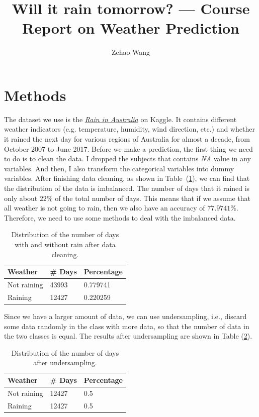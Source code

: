 \documentclass[11pt, a4paper, jou]{apa7}
\title{Will it rain tomorrow? --- Course Report on Weather Prediction}
\author{Zehao Wang}
\begin{document}
\maketitle
\section{Methods}
The dataset we use is the \href{https://www.kaggle.com/datasets/jsphyg/weather-dataset-rattle-package}{\emph{Rain in Australia}} on Kaggle. It contains different weather indicators (e.g. temperature, humidity, wind direction, etc.) and whether it rained the next day for various regions of Australia for almost a decade, from October 2007 to June 2017. Before we make a prediction, the first thing we need to do is to clean the data. I dropped the subjects that contains \emph{NA} value in any variables. And then, I also transform the categorical variables into dummy variables. After finishing data cleaning, as shown in Table~(\ref{tab:day_imbalance}), we can find that the distribution of the data is imbalanced. The number of days that it rained is only about $22\%$ of the total number of days. This means that if we assume that all weather is not going to rain, then we also have an accuracy of $77.9741\%$. Therefore, we need to use some methods to deal with the imbalanced data. 
\begin{table}[h]
    \centering
    \caption{Distribution of the number of days with and without rain after data cleaning.}
    \label{tab:day_imbalance}
    \begin{tabular}{lll}
    \hline
    Weather     & \# Days & Percentage \\ \hline
    Not raining & 43993   & 0.779741   \\
    Raining     & 12427   & 0.220259   \\ \hline
    \end{tabular}
\end{table}

Since we have a larger amount of data, we can use undersampling, i.e., discard some data randomly in the class with more data, so that the number of data in the two classes is equal. The results after undersampling are shown in Table (\ref{tab:day_undersampling}). 
\begin{table}[h]
    \centering
    \caption{Distribution of the number of days after undersampling.}
    \label{tab:day_undersampling}
    \begin{tabular}{lll}
    \hline
    Weather     & \# Days & Percentage \\ \hline
    Not raining & 12427   & 0.5   \\
    Raining     & 12427   & 0.5   \\ \hline
    \end{tabular}
\end{table}
\end{document}
